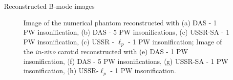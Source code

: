 {\begin{block}{Reconstructed B-mode images}
\begin{figure}[htb]
	\hfill%
	\hfill\null%
	\caption{Image of the numerical phantom reconstructed with (a) DAS - 1 PW insonification, (b) DAS - 5 PW insonifications, (c) USSR-SA - 1 PW insonification, (c) USSR - $\ell_p$ - 1 PW insonification; Image of the \textit{in-vivo} carotid reconstructed with (e) DAS - 1 PW insonification, (f) DAS - 5 PW insonifications, (g) USSR-SA - 1 PW insonification, (h) USSR-$\ell_p$ - 1 PW insonification.}
	\label{fig_Bmode}
\end{figure}
	

\end{block}}
